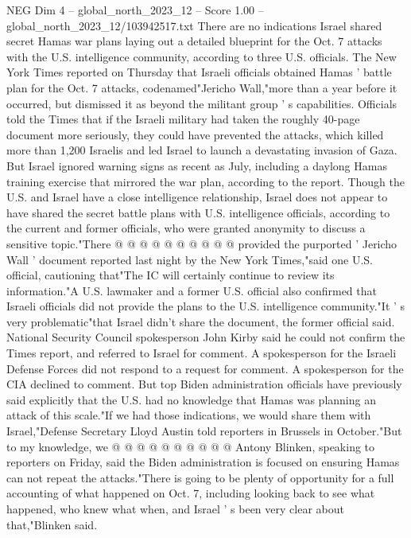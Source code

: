 \begin{textsample}{NEG Dim 4 – global\_north\_2023\_12 – Score 1.00 – global\_north\_2023\_12/103942517.txt}  \label{ex:f4_neg_153}
There are no indications Israel shared secret Hamas war plans laying out a detailed blueprint for the Oct. 7 attacks with the U.S. intelligence community, according to three U.S. officials.
The New York Times reported on Thursday that Israeli officials obtained Hamas ' battle plan for the Oct. 7 attacks, codenamed"Jericho Wall,"more than a year before it occurred, but dismissed it as beyond the militant group ' s capabilities.
Officials told the Times that if the Israeli military had taken the roughly 40-page document more seriously, they could have prevented the attacks, which killed more than 1,200 Israelis and led Israel to launch a devastating invasion of Gaza.
But Israel ignored warning signs as recent as July, including a daylong Hamas training exercise that mirrored the war plan, according to the report.
Though the U.S. and Israel have a close intelligence relationship, Israel does not appear to have shared the secret battle plans with U.S. intelligence officials, according to the current and former officials, who were granted anonymity to discuss a sensitive topic."There @ @ @ @ @ @ @ @ @ @ provided the purported ' Jericho Wall ' document reported last night by the New York Times,"said one U.S. official, cautioning that"The IC will certainly continue to review its information."A U.S. lawmaker and a former U.S. official also confirmed that Israeli officials did not provide the plans to the U.S. intelligence community."It ' s very problematic"that Israel didn't share the document, the former official said.
National Security Council spokesperson John Kirby said he could not confirm the Times report, and referred to Israel for comment.
A spokesperson for the Israeli Defense Forces did not respond to a request for comment.
A spokesperson for the CIA declined to comment.
But top Biden administration officials have previously said explicitly that the U.S. had no knowledge that Hamas was planning an attack of this scale."If we had those indications, we would share them with Israel,"Defense Secretary Lloyd Austin told reporters in Brussels in October."But to my knowledge, we @ @ @ @ @ @ @ @ @ @ Antony Blinken, speaking to reporters on Friday, said the Biden administration is focused on ensuring Hamas can not repeat the attacks."There is going to be plenty of opportunity for a full accounting of what happened on Oct. 7, including looking back to see what happened, who knew what when, and Israel ' s been very clear about that,"Blinken said.

\end{textsample}

